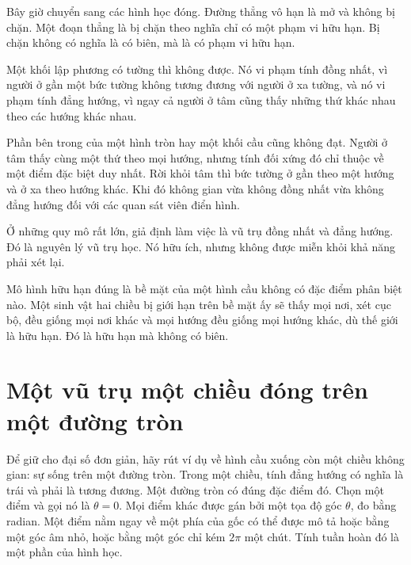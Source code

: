 Bây giờ chuyển sang các hình học đóng. Đường thẳng vô hạn là mở và không bị chặn. Một đoạn thẳng là bị chặn theo nghĩa chỉ có một phạm vi hữu hạn. Bị chặn không có nghĩa là có biên, mà là có phạm vi hữu hạn.

Một khối lập phương có tường thì không được. Nó vi phạm tính đồng nhất, vì người ở gần một bức tường không tương đương với người ở xa tường, và nó vi phạm tính đẳng hướng, vì ngay cả người ở tâm cũng thấy những thứ khác nhau theo các hướng khác nhau.

Phần bên trong của một hình tròn hay một khối cầu cũng không đạt. Người ở tâm thấy cùng một thứ theo mọi hướng, nhưng tính đối xứng đó chỉ thuộc về một điểm đặc biệt duy nhất. Rời khỏi tâm thì bức tường ở gần theo một hướng và ở xa theo hướng khác. Khi đó không gian vừa không đồng nhất vừa không đẳng hướng đối với các quan sát viên điển hình.

Ở những quy mô rất lớn, giả định làm việc là vũ trụ đồng nhất và đẳng hướng. Đó là nguyên lý vũ trụ học. Nó hữu ích, nhưng không được miễn khỏi khả năng phải xét lại.

\begin{classroomqa}
\end{classroomqa}

Mô hình hữu hạn đúng là bề mặt của một hình cầu không có đặc điểm phân biệt nào. Một sinh vật hai chiều bị giới hạn trên bề mặt ấy sẽ thấy mọi nơi, xét cục bộ, đều giống mọi nơi khác và mọi hướng đều giống mọi hướng khác, dù thế giới là hữu hạn. Đó là hữu hạn mà không có biên.

\section{Một vũ trụ một chiều đóng trên một đường tròn}

Để giữ cho đại số đơn giản, hãy rút ví dụ về hình cầu xuống còn một chiều không gian: sự sống trên một đường tròn. Trong một chiều, tính đẳng hướng có nghĩa là trái và phải là tương đương. Một đường tròn có đúng đặc điểm đó. Chọn một điểm và gọi nó là \(\theta=0\). Mọi điểm khác được gán bởi một tọa độ góc \(\theta\), đo bằng radian. Một điểm nằm ngay về một phía của gốc có thể được mô tả hoặc bằng một góc âm nhỏ, hoặc bằng một góc chỉ kém \(2\pi\) một chút. Tính tuần hoàn đó là một phần của hình học.

